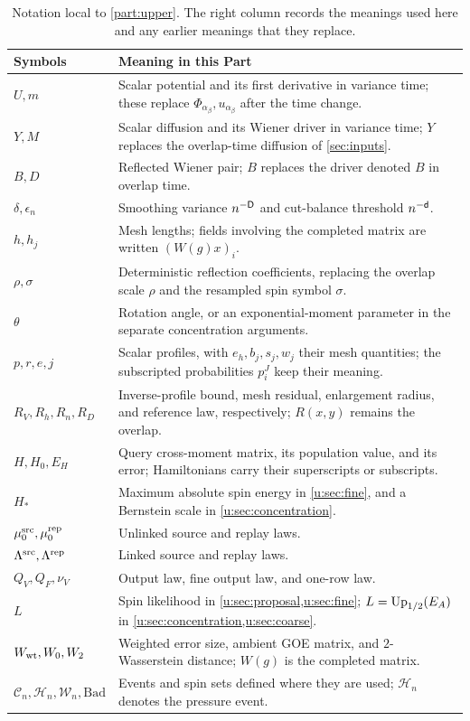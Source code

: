 \begin{table}[htbp]
\centering
\small
\caption{Notation local to \cref{part:upper}. The right column records
the meanings used here and any earlier meanings that they replace.}
\label{u:tab:local-notation}
\begin{tabular}{@{}>{\raggedright\arraybackslash}p{}>{\raggedright\arraybackslash}p{}@{}}
\toprule
Symbols & Meaning in this Part\\
\midrule
$U,m$ & Scalar potential and its first derivative in variance time;
these replace $\Phi_{\alpha_\beta},u_{\alpha_\beta}$ after the time change.\\
$Y,M$ & Scalar diffusion and its Wiener driver in variance time;
$Y$ replaces the overlap-time diffusion of \cref{sec:inputs}.\\
$B,D$ & Reflected Wiener pair; $B$ replaces the driver denoted $B$
in overlap time.\\
$\delta,\epsilon_n$ & Smoothing variance $n^{-\mathsf{D}}$ and cut-balance
threshold $n^{-\mathsf{d}}$.\\
$h,h_j$ & Mesh lengths; fields involving the completed matrix are
written $(W(g)x)_i$.\\
$\rho,\sigma$ & Deterministic reflection coefficients, replacing the
overlap scale $\rho$ and the resampled spin symbol $\sigma$.\\
$\theta$ & Rotation angle, or an exponential-moment parameter in the
separate concentration arguments.\\
$p,r,e,j$ & Scalar profiles, with $e_h,b_j,s_j,w_j$ their mesh quantities;
the subscripted probabilities $p_i^J$ keep their meaning.\\
$R_V,R_h,R_n,R_D$ & Inverse-profile bound, mesh residual, enlargement
radius, and reference law, respectively; $R(x,y)$ remains the overlap.\\
$H,H_0,E_H$ & Query cross-moment matrix, its population value, and
its error; Hamiltonians carry their superscripts or subscripts.\\
$H_*$ & Maximum absolute spin energy in \cref{u:sec:fine}, and a
Bernstein scale in \cref{u:sec:concentration}.\\
$\mu^{\rm src}_0,\mu^{\rm rep}_0$ & Unlinked source and replay laws.\\
$\Lambda^{\rm src},\Lambda^{\rm rep}$ & Linked source and replay laws.\\
$Q_V,Q_F,\nu_V$ & Output law, fine output law, and one-row law.\\
$L$ & Spin likelihood in \cref{u:sec:proposal,u:sec:fine};
$L=\operatorname{Up}_{1/2}(E_A)$ in \cref{u:sec:concentration,u:sec:coarse}.\\
$W_{\rm wt},W_0,W_2$ & Weighted error size, ambient GOE matrix, and
$2$-Wasserstein distance; $W(g)$ is the completed matrix.\\
$\mathcal C_n,\mathcal H_n,\mathcal W_n,\mathrm{Bad}$ & Events and spin sets defined
where they are used; $\mathcal H_n$ denotes the pressure event.\\
\bottomrule
\end{tabular}
\end{table}

